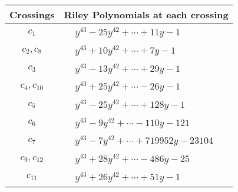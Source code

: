 \documentclass[1p]{elsarticle_modified}
\theoremstyle{definition}
\begin{document}
\begin{tabular}{m{50pt}|m{274pt}}
Crossings & \hspace{64pt}Riley Polynomials at each crossing \\
\hline $$\begin{aligned}c_{1}\end{aligned}$$&$\begin{aligned}
&y^{43}-25 y^{42}+\cdots+11 y-1
\end{aligned}$\\
\hline $$\begin{aligned}c_{2},c_{8}\end{aligned}$$&$\begin{aligned}
&y^{43}+10 y^{42}+\cdots+7 y-1
\end{aligned}$\\
\hline $$\begin{aligned}c_{3}\end{aligned}$$&$\begin{aligned}
&y^{43}-13 y^{42}+\cdots+29 y-1
\end{aligned}$\\
\hline $$\begin{aligned}c_{4},c_{10}\end{aligned}$$&$\begin{aligned}
&y^{43}+25 y^{42}+\cdots-26 y-1
\end{aligned}$\\
\hline $$\begin{aligned}c_{5}\end{aligned}$$&$\begin{aligned}
&y^{43}-25 y^{42}+\cdots+128 y-1
\end{aligned}$\\
\hline $$\begin{aligned}c_{6}\end{aligned}$$&$\begin{aligned}
&y^{43}-9 y^{42}+\cdots-110 y-121
\end{aligned}$\\
\hline $$\begin{aligned}c_{7}\end{aligned}$$&$\begin{aligned}
&y^{43}-7 y^{42}+\cdots+719952 y-23104
\end{aligned}$\\
\hline $$\begin{aligned}c_{9},c_{12}\end{aligned}$$&$\begin{aligned}
&y^{43}+28 y^{42}+\cdots-486 y-25
\end{aligned}$\\
\hline $$\begin{aligned}c_{11}\end{aligned}$$&$\begin{aligned}
&y^{43}+26 y^{42}+\cdots+51 y-1
\end{aligned}$\\
\hline
\end{tabular}\\~\\
\end{document}
